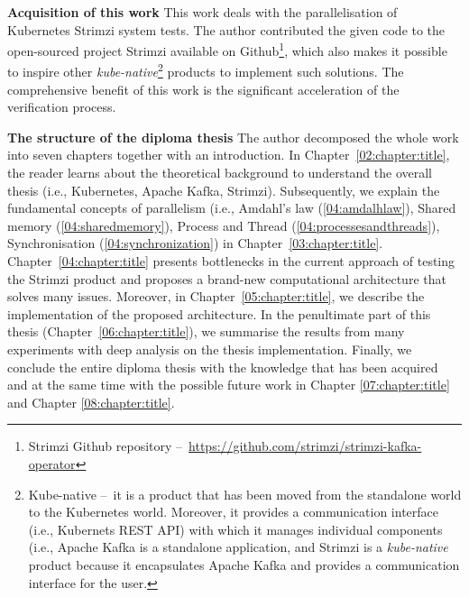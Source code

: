 \textbf{Acquisition of this work} \quad This work deals with the parallelisation of Kubernetes Strimzi system tests.
The author contributed the given code to the open-sourced project Strimzi available on Github\footnote{Strimzi Github repository \---\ \url{https://github.com/strimzi/strimzi-kafka-operator}}, which also makes it possible to inspire other \emph{kube-native}\footnote{Kube-native \---\ it is a product that has been moved from the standalone world to the Kubernetes world. Moreover, it provides a communication interface (i.e., Kubernets REST API) with which it manages individual components (i.e., Apache Kafka is a standalone application, and Strimzi is a \emph{kube-native} product because it encapsulates Apache Kafka and provides a communication interface for the user.} products to implement such solutions.
The comprehensive benefit of this work is the significant acceleration of the verification process.
\bigskip

\textbf{The structure of the diploma thesis} \quad The author decomposed the whole work into seven chapters together with an introduction.
In Chapter~\ref{02:chapter:title}, the reader learns about the theoretical background to understand the overall thesis (i.e., Kubernetes, Apache Kafka, Strimzi).
Subsequently, we explain the fundamental concepts of parallelism (i.e., Amdahl's law (\ref{04:amdalhlaw}), Shared memory (\ref{04:sharedmemory}), Process and Thread (\ref{04:processesandthreads}), Synchronisation (\ref{04:synchronization}) in Chapter~\ref{03:chapter:title}.
Chapter~\ref{04:chapter:title} presents bottlenecks in the current approach of testing the Strimzi product and proposes a brand-new computational architecture that solves many issues.
Moreover, in Chapter~\ref{05:chapter:title}, we describe the implementation of the proposed architecture.
In the penultimate part of this thesis (Chapter~\ref{06:chapter:title}), we summarise the results from many experiments with deep analysis on the thesis implementation.
Finally, we conclude the entire diploma thesis with the knowledge that has been acquired and at the same time with the possible future work in Chapter \ref{07:chapter:title} and Chapter \ref{08:chapter:title}.